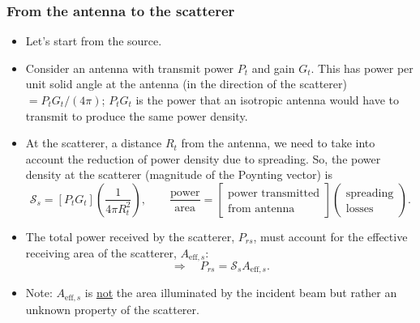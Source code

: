 \documentclass[11pt, oneside]{article}
\begin{document}
\subsubsection{From the antenna to the scatterer}

\begin{itemize}
	\item Let's start from the source.
	\item Consider an antenna with transmit power $P_t$ and gain $G_t$. This has power per unit solid angle at the antenna (in the direction of the scatterer) $= P_tG_t/(4\pi)$; $P_tG_t$ is the power that an isotropic antenna would have to transmit to produce the same power density.
	\item At the scatterer, a distance $R_t$ from the antenna, we need to take into account the reduction of power density due to spreading. So, the power density at the scatterer (magnitude of the Poynting vector) is
	\begin{equation}
		\label{e:Ss}
		\mathcal{S}_s = \left[P_tG_t\right]\left(\frac{1}{4\pi R_t^2}\right),
		\qquad
		\frac{\text{power}}{\text{area}} = \left[\begin{array}{c}\text{power transmitted}\\ \text{from antenna}\end{array}\right]\left(\begin{array}{c}\text{spreading}\\ \text{losses}\end{array}\right).
	\end{equation}
	\item The total power received by the scatterer, $P_{rs}$, must account for the effective receiving area of the scatterer, $A_{\mathrm{eff},s}$:
	\begin{equation}
		\label{e:Prs}
		\Rightarrow\quad P_{rs} = \mathcal{S}_sA_{\mathrm{eff},s}.
	\end{equation}
	\item[$\bigstar$] Note: $A_{\mathrm{eff},s}$ is \underline{not} the area illuminated by the incident beam but rather an unknown property of the scatterer.
\end{itemize}
\end{document}
